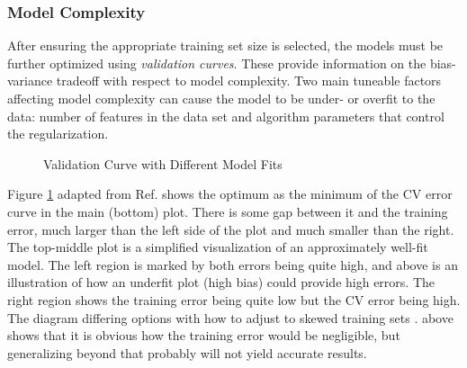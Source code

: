 \subsubsection{Model Complexity}

After ensuring the appropriate training set size is selected, the models must
be further optimized using \textit{validation curves}.  These provide
information on the bias-variance tradeoff with respect to model complexity. Two
main tuneable factors affecting model complexity can cause the model to be
under- or overfit to the data: number of features in the data set and algorithm
parameters that control the regularization.

\begin{figure}[!htb]
  \centering
  \caption{Validation Curve with Different Model Fits}
  \label{fig:validation}
\end{figure}

Figure \ref{fig:validation} adapted from Ref. \cite{elements_stats} shows the
optimum as the minimum of the \gls{CV} error curve in the main (bottom)
plot. There is some gap between it and the training error, much larger than the
left side of the plot and much smaller than the right.  The top-middle plot is
a simplified visualization of an approximately well-fit model.  The left region
is marked by both errors being quite high, and above is an  illustration of how
an underfit plot (high bias) could provide high errors. The right region shows
the training error being quite low but the \gls{CV} error being high.
The diagram differing options with how to adjust to skewed training sets
\cite{scikit}.  above shows that it is obvious how the training error would be
negligible, but generalizing beyond that probably will not yield accurate
results. 

